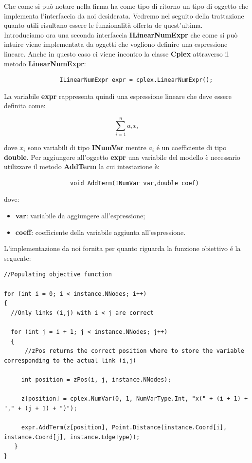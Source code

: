 \documentclass[11pt]{article}
\begin{document}
Che come si può notare nella firma ha come tipo di ritorno un tipo di oggetto che implementa l'interfaccia da noi desiderata. Vedremo nel seguito della trattazione quanto utili risultano essere le funzionalità offerta de quest'ultima.\\
Introduciamo ora una seconda interfaccia \textbf{ILinearNumExpr} che come si può intuire viene implementata da oggetti che vogliono definire una espressione lineare. Anche in questo caso ci viene incontro la classe \textbf{Cplex} attraverso il metodo \textbf{LinearNumExpr}:
\begin{lstlisting}
                ILinearNumExpr expr = cplex.LinearNumExpr();
\end{lstlisting}

La variabile \textbf{expr} rappresenta quindi una espressione lineare che deve essere definita come:

$$\displaystyle{\sum_{i = 1}^n a_i x_i} $$

dove \textbf{$x_i$} sono variabili di tipo \textbf{INumVar} mentre \textbf{$a_i$} \'e un coefficiente di tipo \textbf{double}. Per aggiungere all'oggetto \textbf{expr} una variabile del modello \`e necessario utilizzare il metodo \textbf{AddTerm} la cui intestazione \`e:

\begin{lstlisting}
                   void AddTerm(INumVar var,double coef)
\end{lstlisting}

dove:

\begin{itemize}
\item \textbf{var}: variabile da aggiungere all'espressione;
\item  \textbf{coeff}: coefficiente della variabile aggiunta all'espressione.
\end{itemize}

L'implementazione da noi fornita per quanto riguarda la funzione obiettivo \'e la seguente:

\begin{lstlisting}
//Populating objective function

for (int i = 0; i < instance.NNodes; i++)
{
  //Only links (i,j) with i < j are correct
  
  for (int j = i + 1; j < instance.NNodes; j++)
  {
      //zPos returns the correct position where to store the variable corresponding to the actual link (i,j)
           
     int position = zPos(i, j, instance.NNodes);
           
     z[position] = cplex.NumVar(0, 1, NumVarType.Int, "x(" + (i + 1) + "," + (j + 1) + ")");
         
     expr.AddTerm(z[position], Point.Distance(instance.Coord[i], instance.Coord[j], instance.EdgeType));      
   }
}

\end{lstlisting}
\end{document}
